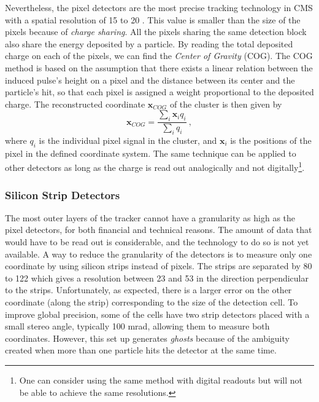 				Nevertheless, the pixel detectors are the most precise tracking technology in CMS with a spatial resolution of 15 to 20 \um{}. This value is smaller than the size of the pixels because of \emph{charge sharing}. All the pixels sharing the same detection block also share the energy deposited by a particle. By reading the total deposited charge on each of the pixels, we can find the \emph{Center of Gravity} (COG). The COG method is based on the assumption that there exists a linear relation between the induced pulse's height on a pixel and the distance between its center and the particle's hit, so that each pixel is assigned a weight proportional to the deposited charge. The reconstructed coordinate $ \mathbf{x}_{COG} $ of the cluster is then given by
				\begin{equation}
					\mathbf{x}_{COG} = \frac{\sum_i \mathbf{x}_i q_i}{\sum_i q_i} \ ,
					\label{eq:lhc_and_cms__charge_sharing}
				\end{equation}
				where $ q_i $ is the individual pixel signal in the cluster, and $ \mathbf{x}_i $ is the positions of the pixel in the defined coordinate system. The same technique can be applied to other detectors as long as the charge is read out analogically and not digitally\footnote{One can consider using the same method with digital readouts but will not be able to achieve the same resolutions.}.

			\subsubsection{Silicon Strip Detectors}
			\label{sec:lhc_and_cms__silicon_strip_detectors}

				The most outer layers of the tracker cannot have a granularity as high as the pixel detectors, for both financial and technical reasons. The amount of data that would have to be read out is considerable, and the technology to do so is not yet available. A way to reduce the granularity of the detectors is to measure only one coordinate by using silicon strips instead of pixels. The strips are separated by 80 to 122 \um{} which gives a resolution between 23 \um{} and 53 \um{} in the direction perpendicular to the strips. Unfortunately, as expected, there is a larger error on the other coordinate (along the strip) corresponding to the size of the detection cell. To improve global precision, some of the cells have two strip detectors placed with a small stereo angle, typically 100 mrad, allowing them to measure both coordinates. However, this set up generates \emph{ghosts} because of the ambiguity created when more than one particle hits the detector at the same time.

